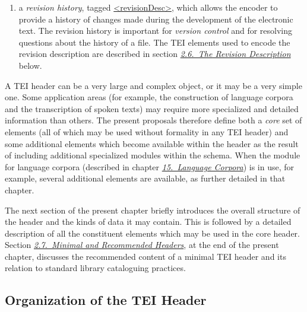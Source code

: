 \begin{enumerate}
\item a \textit{revision history}, tagged \hyperref[TEI.revisionDesc]{<revisionDesc>}, which allows the encoder to provide a history of changes made during the development of the electronic text. The revision history is important for \textit{version control} and for resolving questions about the history of a file. The TEI elements used to encode the revision description are described in section \textit{\hyperref[HD6]{2.6.\ The Revision Description}} below.
\end{enumerate}\par
A TEI header can be a very large and complex object, or it may be a very simple one. Some application areas (for example, the construction of language corpora and the transcription of spoken texts) may require more specialized and detailed information than others. The present proposals therefore define both a \textit{core} set of elements (all of which may be used without formality in any TEI header) and some additional elements which become available within the header as the result of including additional specialized modules within the schema. When the module for language corpora (described in chapter \textit{\hyperref[CC]{15.\ Language Corpora}}) is in use, for example, several additional elements are available, as further detailed in that chapter.\par
The next section of the present chapter briefly introduces the overall structure of the header and the kinds of data it may contain. This is followed by a detailed description of all the constituent elements which may be used in the core header. Section \textit{\hyperref[HD7]{2.7.\ Minimal and Recommended Headers}}, at the end of the present chapter, discusses the recommended content of a minimal TEI header and its relation to standard library cataloguing practices.
\subsection[{Organization of the TEI Header}]{Organization of the TEI Header}\label{HD1}

